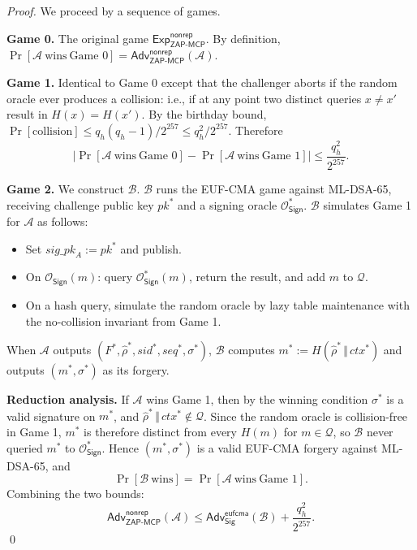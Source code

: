 \documentclass[11pt,a4paper]{article}
\theoremstyle{definition}
\theoremstyle{remark}
\newcommand{\zapmcp}{\textsf{ZAP-MCP}\xspace}
\newcommand{\Adv}{\mathsf{Adv}}
\newcommand{\Exp}{\mathsf{Exp}}
\newcommand{\Sign}{\textsf{Sig}}
\begin{document}
\begin{proof}
We proceed by a sequence of games.

\textbf{Game 0.} The original game $\Exp^{\mathsf{nonrep}}_{\zapmcp{}}$. By definition,
$\Pr[\mathcal{A}\ \text{wins}\ \text{Game 0}] = \Adv^{\mathsf{nonrep}}_{\zapmcp{}}(\mathcal{A})$.

\textbf{Game 1.} Identical to Game 0 except that the challenger aborts
if the random oracle ever produces a collision: i.e., if at any point
two distinct queries $x \neq x'$ result in $H(x) = H(x')$. By the
birthday bound, $\Pr[\text{collision}] \leq q_h(q_h-1)/2^{257} \leq
q_h^2/2^{257}$. Therefore
\[
|\Pr[\mathcal{A}\ \text{wins}\ \text{Game 0}] - \Pr[\mathcal{A}\ \text{wins}\ \text{Game 1}]|
\leq \frac{q_h^2}{2^{257}}.
\]

\textbf{Game 2.} We construct $\mathcal{B}$. $\mathcal{B}$ runs the
EUF-CMA game against ML-DSA-65, receiving challenge public key
$\mathit{pk}^*$ and a signing oracle $\mathcal{O}^*_{\mathsf{Sign}}$.
$\mathcal{B}$ simulates Game 1 for $\mathcal{A}$ as follows:
\begin{itemize}[leftmargin=2em,itemsep=0.2em]
\item Set $\mathit{sig\_pk}_A := \mathit{pk}^*$ and publish.
\item On $\mathcal{O}_{\mathsf{Sign}}(m)$: query
$\mathcal{O}^*_{\mathsf{Sign}}(m)$, return the result, and add $m$ to
$\mathcal{Q}$.
\item On a hash query, simulate the random oracle by lazy table
maintenance with the no-collision invariant from Game 1.
\end{itemize}
When $\mathcal{A}$ outputs $(F^*, \hat{\rho}^*, \mathit{sid}^*,
\mathit{seq}^*, \sigma^*)$, $\mathcal{B}$ computes
$m^* := H(\hat{\rho}^* \,\Vert\, \mathit{ctx}^*)$ and outputs
$(m^*, \sigma^*)$ as its forgery.

\textbf{Reduction analysis.} If $\mathcal{A}$ wins Game 1, then by the
winning condition $\sigma^*$ is a valid signature on $m^*$, and
$\hat{\rho}^* \,\Vert\, \mathit{ctx}^* \notin \mathcal{Q}$. Since the
random oracle is collision-free in Game 1, $m^*$ is therefore distinct
from every $H(m)$ for $m \in \mathcal{Q}$, so $\mathcal{B}$ never
queried $m^*$ to $\mathcal{O}^*_{\mathsf{Sign}}$. Hence
$(m^*, \sigma^*)$ is a valid EUF-CMA forgery against ML-DSA-65, and
\[
\Pr[\mathcal{B}\ \text{wins}] = \Pr[\mathcal{A}\ \text{wins}\ \text{Game 1}].
\]
Combining the two bounds:
\[
\Adv^{\mathsf{nonrep}}_{\zapmcp{}}(\mathcal{A}) \leq
\Adv^{\mathsf{eufcma}}_{\Sign}(\mathcal{B}) + \frac{q_h^2}{2^{257}}.
\]
\qed
\end{proof}
\end{document}
